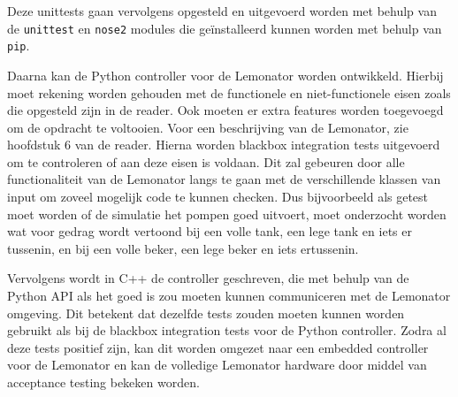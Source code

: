 \documentclass{article}
\begin{document}
	Deze unittests gaan vervolgens opgesteld en uitgevoerd worden met behulp van de \texttt{unittest} en \texttt{nose2} modules die geïnstalleerd kunnen worden met behulp van \texttt{pip}.
	
	Daarna kan de Python controller voor de Lemonator worden ontwikkeld. Hierbij moet rekening worden gehouden met de functionele en niet-functionele eisen zoals die opgesteld zijn in de reader. Ook moeten er extra features worden toegevoegd om de opdracht te voltooien. Voor een beschrijving van de Lemonator, zie hoofdstuk 6 van de reader. Hierna worden blackbox integration tests uitgevoerd om te controleren of aan deze eisen is voldaan. Dit zal gebeuren door alle functionaliteit van de Lemonator langs te gaan met de verschillende klassen van input om zoveel mogelijk code te kunnen checken. Dus bijvoorbeeld als getest moet worden of de simulatie het pompen goed uitvoert, moet onderzocht worden wat voor gedrag wordt vertoond bij een volle tank, een lege tank en iets er tussenin, en bij een volle beker, een lege beker en iets ertussenin.
	
	Vervolgens wordt in C++ de controller geschreven, die met behulp van de Python API als het goed is zou moeten kunnen communiceren met de Lemonator omgeving. Dit betekent dat dezelfde tests zouden moeten kunnen worden gebruikt als bij de blackbox integration tests voor de Python controller. Zodra al deze tests positief zijn, kan dit worden omgezet naar een embedded controller voor de Lemonator en kan de volledige Lemonator hardware door middel van acceptance testing bekeken worden.
	
\end{document}
